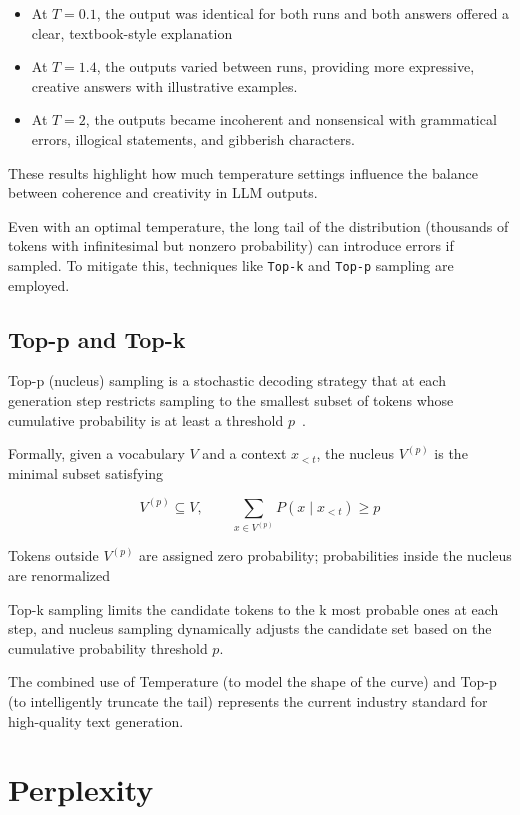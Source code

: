 \begin{itemize}
    \item At $T=0.1$, the output was identical for both runs and both answers offered a clear, textbook-style explanation
    \item At $T=1.4$, the outputs varied between runs, providing more expressive, creative answers with illustrative examples.
    \item At $T=2$, the outputs became incoherent and nonsensical with grammatical errors, illogical statements, and gibberish characters.
\end{itemize}

These results highlight how much temperature settings influence the balance between coherence and creativity in \ac{LLM} outputs.

Even with an optimal temperature, the long tail of the distribution (thousands of tokens with infinitesimal but nonzero probability) can introduce errors if sampled.
To mitigate this, techniques like \texttt{Top-k} and \texttt{Top-p} sampling are employed.

\subsection{Top-p and Top-k}
Top-p (nucleus) sampling is a stochastic decoding strategy that at each generation step restricts sampling to the smallest
subset of tokens whose cumulative probability is at least a threshold $p$~\cite{site:wikipediaToppSampling}.

Formally, given a vocabulary $V$ and a context $x_{<t}$, the nucleus $V^{(p)}$ is the minimal subset satisfying

\[ V^{(p)} \subseteq V,\qquad \sum_{x\in V^{(p)}} P(x\mid x_{<t}) \ge p \]

Tokens outside \(V^{(p)}\) are assigned zero probability; probabilities inside the nucleus are renormalized

Top-k sampling limits the candidate tokens to the k most probable ones at each step, and nucleus sampling dynamically adjusts 
the candidate set based on the cumulative probability threshold \(p\).

The combined use of Temperature (to model the shape of the curve) and Top-p (to intelligently truncate the tail) represents the current 
industry standard for high-quality text generation.

\section{Perplexity}\label{sec:perplexity}

